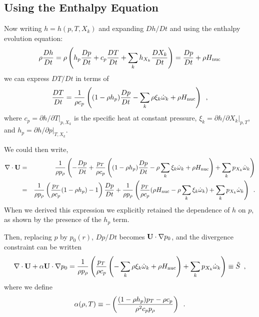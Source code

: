\subsection{Using the Enthalpy Equation}

Now writing $h = h(p,T,X_k)$ and expanding $Dh/Dt$ and using the enthalpy evolution equation:
\begin{equation}
\rho \frac{D h}{Dt}  = \rho \left( h_p \frac{D p}{Dt} + c_p \frac{D T}{Dt} + \sum_k h_{X_k} \frac{D X_k}{Dt} \right)
                     = \frac{D p}{D t} + \rho {H_{\rm nuc}}
\end{equation}
we can express $DT/Dt$ in terms of 
\begin{equation}
\frac{DT}{Dt} = \frac{1}{\rho c_p} \left( (1 - \rho h_p) \frac{D p}{D t}
- \sum_k \rho \xi_k \dot{\omega}_k + \rho {H_{\rm nuc}} \right) \enskip , \label{eq:dTdt}
\end{equation}
where $c_p = \left.\partial h/\partial T\right|_{p,X_k}$ is the
specific heat at constant pressure,
$\xi_k = \left.\partial h/\partial X_k \right|_{p,T}$,
and $h_p = \left.\partial h/\partial p\right|_{T,X_k}.$

We could then write,
\begin{eqnarray*}
\nabla \cdot {\bf U} &=& \frac{1}{\rho p_\rho} \left(
- \frac{D p}{D t} + \frac{p_T}{\rho c_p}
  \left( (1 - \rho h_p) \frac{D p}{D t} - \rho \sum_k \xi_k \dot{\omega}_k + \rho {H_{\rm nuc}} \right)
+ \sum_k p_{X_k} \dot{\omega}_k \right)  \\
                 &=& \frac{1}{\rho p_\rho}
  \left( \frac{p_T}{\rho c_p}(1  - \rho h_p) - 1 \right) \frac{D p}{D t}
 + \frac{1}{\rho p_\rho} \left(
  \frac{p_T}{\rho c_p} (\rho {H_{\rm nuc}} - \rho \sum_k \xi_k   \dot{\omega}_k)
                               + \sum_k p_{X_k} \dot{\omega}_k \right) \enskip .
\end{eqnarray*}
When we derived this expression we explicitly retained the dependence of $h$ on $p$,
as shown by the presence of the $h_p$ term.   

Then, replacing $p$ by $p_0(r)$, $Dp/Dt$ becomes ${\bf U} \cdot
\nabla p_0$, and the divergence constraint can be written
\begin{equation}
\nabla \cdot {\bf U} + \alpha {\bf U} \cdot \nabla p_0 =
\frac{1}{\rho p_\rho} \left(
   \frac{p_T}{\rho c_p} \left(
  - \sum_k\rho  \xi_k \dot{\omega}_k + \rho {H_{\rm nuc}} \right)
 + \sum_k p_{X_k} \dot{\omega}_k \right)  \equiv \tilde{S} \enskip \label{eq:full_divu_constraint} ,
\end{equation}
where we define
\begin{equation}
\alpha(\rho,T) \equiv - \left( \frac{(1 - \rho h_p )p_T - \rho c_p}{\rho^2
  c_p p_\rho} \right) \enskip . \label{eq:alphadef}
\end{equation}

